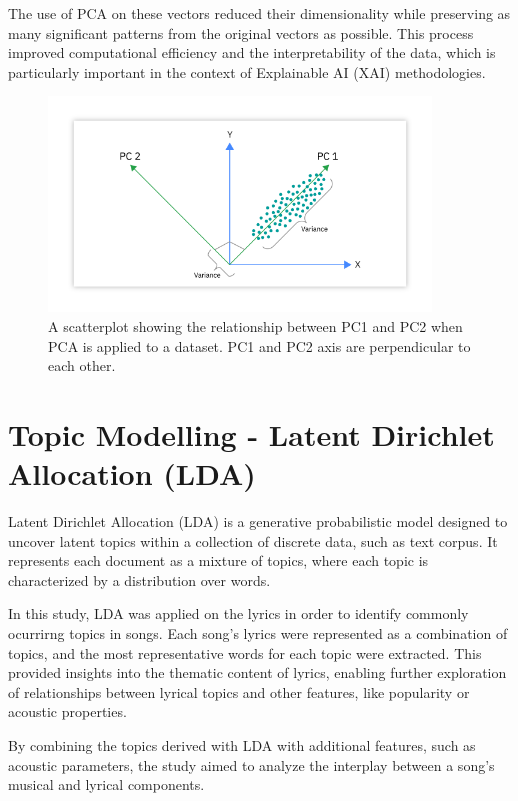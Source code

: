 The use of PCA on these vectors reduced their dimensionality while preserving
as many significant patterns from the original vectors as possible. This
process improved computational efficiency and the interpretability of the data,
which is particularly important in the context of Explainable AI (XAI)
methodologies.

\begin{center}
\begin{figure}[H]
  \centering
  \includegraphics[width=4in]{img/pca.png}
  \caption{A scatterplot showing the relationship between PC1 and PC2 when PCA
  is applied to a dataset. PC1 and PC2 axis are perpendicular to each other.\cite{pca}}
  \label{Figure:fig_beh}
\end{figure}
\end{center}


\section{Topic Modelling - Latent Dirichlet Allocation (LDA)}
\label{sec:topicmodelling}

Latent Dirichlet Allocation (LDA) is a generative probabilistic model
designed to uncover latent topics within a collection of discrete data, such as
text corpus.  It represents each document as a mixture of topics, where each
topic is characterized by a distribution over words. \cite{lda}

In this study, LDA was applied on the lyrics in order to identify commonly
ocurrirng topics in songs. Each song's lyrics were represented as a combination
of topics, and the most representative words for each topic were extracted.
This provided insights into the thematic content of lyrics, enabling further
exploration of relationships between lyrical topics and other features, like
popularity or acoustic properties.

By combining the topics derived with LDA with additional features, such as
acoustic parameters, the study aimed to analyze the interplay between a song's
musical and lyrical components.



